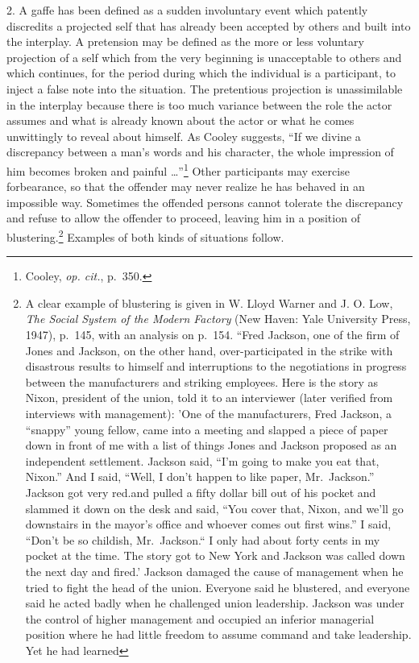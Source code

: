 \documentclass[openany,nobib]{tufte-book}
\begin{document}
2. A gaffe has been defined as a sudden involuntary event which patently
discredits a projected self that has already been accepted by others and
built into the interplay. A pretension may be defined as the more or
less voluntary projection of a self which from the very beginning is
unacceptable to others and which continues, for the period during which
the individual is a participant, to inject a false note into the
situation. The pretentious projection is unassimilable in the interplay
because there is too much variance between the role the actor assumes
and what is already known about the actor or what he comes unwittingly
to reveal about himself. As Cooley suggests, ``If we divine a
discrepancy between a man's words and his character, the whole
impression of him becomes broken and painful \ldots''\footnote{Cooley,
  \emph{op. cit.}, p.~350.} Other participants may exercise forbearance,
so that the offender may never realize he has behaved in an impossible
way. Sometimes the offended persons cannot tolerate the discrepancy and
refuse to allow the offender to proceed, leaving him in a position of
blustering.\footnote{A clear example of blustering is given in W. Lloyd
  Warner and J. O. Low, \emph{The Social System of the Modern Factory}
  (New Haven: Yale University Press, 1947), p.~145, with an analysis on
  p.~154. ``Fred Jackson, one of the firm of Jones and Jackson, on the
  other hand, over-participated in the strike with disastrous results to
  himself and interruptions to the negotiations in progress between the
  manufacturers and striking employees. Here is the story as Nixon,
  president of the union, told it to an interviewer (later verified from
  interviews with management): 'One of the manufacturers, Fred Jackson,
  a ``snappy'' young fellow, came into a meeting and slapped a piece of
  paper down in front of me with a list of things Jones and Jackson
  proposed as an independent settlement. Jackson said, ``I'm going to
  make you eat that, Nixon.'' And I said, ``Well, I don't happen to like
  paper, Mr.~Jackson.'' Jackson got very red.and pulled a fifty dollar
  bill out of his pocket and slammed it down on the desk and said, ``You
  cover that, Nixon, and we'll go downstairs in the mayor's office and
  whoever comes out first wins.'' I said, ``Don't be so childish,
  Mr.~Jackson.`` I only had about forty cents in my pocket at the time.
  The story got to New York and Jackson was called down the next day and
  fired.' Jackson damaged the cause of management when he tried to fight
  the head of the union. Everyone said he blustered, and everyone said
  he acted badly when he challenged union leadership. Jackson was under
  the control of higher management and occupied an inferior managerial
  position where he had little freedom to assume command and take
  leadership. Yet he had learned} Examples of
both kinds of situations follow.
\end{document}
